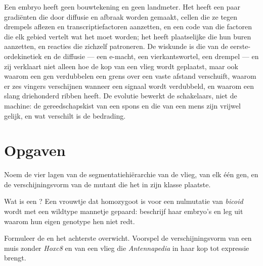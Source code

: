 \begin{remark}\label{rem:b3:developmental-genetics:remark}
Een embryo heeft geen bouwtekening en geen landmeter. Het heeft een
paar gradiënten die door diffusie en afbraak worden gemaakt, cellen die
ze tegen drempels aflezen en transcriptiefactoren aanzetten, en een
code van die factoren die elk gebied vertelt wat het moet worden; het
heeft plaatselijke  die hun buren aanzetten, en reacties
die zichzelf patroneren. De wiskunde is die van de eerste-ordekinetiek
en de diffusie --- een e-macht, een vierkantswortel, een drempel --- en
zij verklaart niet alleen hoe de kop van een vlieg wordt geplaatst,
maar ook waarom een gen verdubbelen een grens over een vaste afstand
verschuift, waarom er zes vingers verschijnen wanneer een signaal wordt
verdubbeld, en waarom een slang driehonderd ribben heeft. De evolutie
bewerkt de schakelaars, niet de machine: de gereedschapskist van een
spons en die van een mens zijn vrijwel gelijk, en wat verschilt is de
bedrading.
\end{remark}

\section{Opgaven}

\begin{exercise}[$\star$]\label{exo:b3:developmental-genetics:1}
Noem de vier lagen van de segmentatiehiërarchie van de vlieg, van elk
één gen, en de verschijningsvorm van de mutant die het in zijn klasse
plaatste.
\end{exercise}

\begin{exercise}[$\star$]\label{exo:b3:developmental-genetics:2}
Wat is een ? Een vrouwtje dat homozygoot is voor een
nulmutatie van \emph{bicoid} wordt met een wildtype mannetje gepaard:
beschrijf haar embryo's en leg uit waarom hun eigen genotype hen niet
redt.
\end{exercise}

\begin{exercise}[$\star$]\label{exo:b3:developmental-genetics:3}
Formuleer de  en het achterste overwicht. Voorspel de
verschijningsvorm van een muis zonder \emph{Hoxc8} en van een vlieg die
\emph{Antennapedia} in haar kop tot expressie brengt.
\end{exercise}

